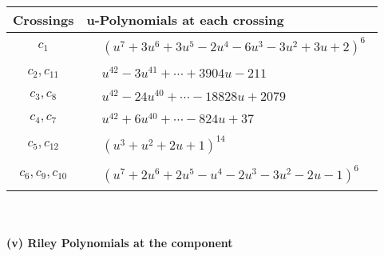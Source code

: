 \documentclass[1p]{elsarticle_modified}
\theoremstyle{definition}
\begin{document}
\begin{tabular}{m{50pt}|m{274pt}}
Crossings & \hspace{64pt}u-Polynomials at each crossing \\
\hline $$\begin{aligned}c_{1}\end{aligned}$$&$\begin{aligned}
&(u^7+3 u^6+3 u^5-2 u^4-6 u^3-3 u^2+3 u+2)^6
\end{aligned}$\\
\hline $$\begin{aligned}c_{2},c_{11}\end{aligned}$$&$\begin{aligned}
&u^{42}-3 u^{41}+\cdots+3904 u-211
\end{aligned}$\\
\hline $$\begin{aligned}c_{3},c_{8}\end{aligned}$$&$\begin{aligned}
&u^{42}-24 u^{40}+\cdots-18828 u+2079
\end{aligned}$\\
\hline $$\begin{aligned}c_{4},c_{7}\end{aligned}$$&$\begin{aligned}
&u^{42}+6 u^{40}+\cdots-824 u+37
\end{aligned}$\\
\hline $$\begin{aligned}c_{5},c_{12}\end{aligned}$$&$\begin{aligned}
&(u^3+u^2+2 u+1)^{14}
\end{aligned}$\\
\hline $$\begin{aligned}c_{6},c_{9},c_{10}\end{aligned}$$&$\begin{aligned}
&(u^7+2 u^6+2 u^5- u^4-2 u^3-3 u^2-2 u-1)^6
\end{aligned}$\\
\hline
\end{tabular}\\~\\
\newpage\renewcommand{\arraystretch}{1}
\flushleft \textbf{(v) Riley Polynomials at the component}\newline \\
\end{document}
